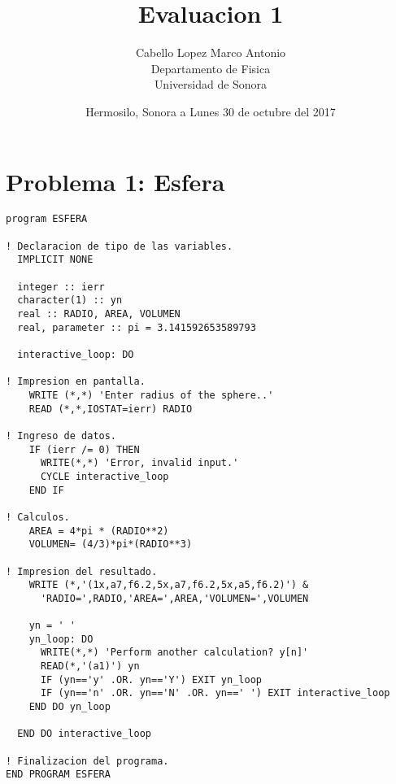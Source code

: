 \documentclass{article}
\title{Evaluacion 1}
\author{Cabello Lopez Marco Antonio\\
Departamento de Fisica \\
Universidad de Sonora}
\date{Hermosilo, Sonora a Lunes 30 de octubre del 2017}
\begin{document}
\maketitle
\clearpage

\section{Problema 1: Esfera}
\begin{verbatim}
program ESFERA

! Declaracion de tipo de las variables.
  IMPLICIT NONE   

  integer :: ierr
  character(1) :: yn
  real :: RADIO, AREA, VOLUMEN
  real, parameter :: pi = 3.141592653589793

  interactive_loop: DO

! Impresion en pantalla.
    WRITE (*,*) 'Enter radius of the sphere..'
    READ (*,*,IOSTAT=ierr) RADIO

! Ingreso de datos.
    IF (ierr /= 0) THEN
      WRITE(*,*) 'Error, invalid input.'
      CYCLE interactive_loop
    END IF

! Calculos.
    AREA = 4*pi * (RADIO**2)
    VOLUMEN= (4/3)*pi*(RADIO**3)

! Impresion del resultado.
    WRITE (*,'(1x,a7,f6.2,5x,a7,f6.2,5x,a5,f6.2)') &
      'RADIO=',RADIO,'AREA=',AREA,'VOLUMEN=',VOLUMEN

    yn = ' '
    yn_loop: DO
      WRITE(*,*) 'Perform another calculation? y[n]'
      READ(*,'(a1)') yn
      IF (yn=='y' .OR. yn=='Y') EXIT yn_loop
      IF (yn=='n' .OR. yn=='N' .OR. yn==' ') EXIT interactive_loop
    END DO yn_loop

  END DO interactive_loop

! Finalizacion del programa.
END PROGRAM ESFERA

\end{verbatim}
\end{document}
